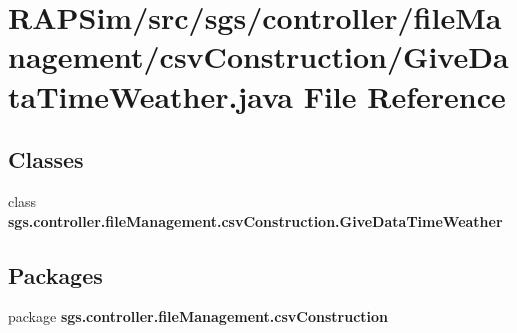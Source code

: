 \section{R\-A\-P\-Sim/src/sgs/controller/file\-Management/csv\-Construction/\-Give\-Data\-Time\-Weather.java File Reference}
\label{_give_data_time_weather_8java}
\subsection*{Classes}
\begin{DoxyCompactItemize}
\item 
class {\bf sgs.\-controller.\-file\-Management.\-csv\-Construction.\-Give\-Data\-Time\-Weather}
\end{DoxyCompactItemize}
\subsection*{Packages}
\begin{DoxyCompactItemize}
\item 
package {\bf sgs.\-controller.\-file\-Management.\-csv\-Construction}
\end{DoxyCompactItemize}

